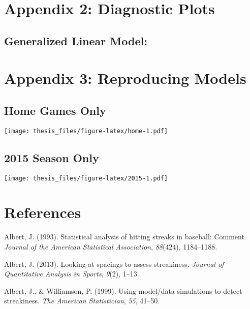 \documentclass[12pt,twoside]{dukestatscithesis}
\theoremstyle{definition}
\theoremstyle{definition}
\theoremstyle{definition}
\theoremstyle{remark}
\begin{document}
\chapter{Appendix 2: Diagnostic
Plots}\label{appendix-2-diagnostic-plots}

\section{Generalized Linear Model:}\label{generalized-linear-model-3}

\chapter{Appendix 3: Reproducing
Models}\label{appendix-3-reproducing-models}

\section{Home Games Only}\label{home-games-only}

\texttt{[image: thesis\_files/figure-latex/home-1.pdf]}

\section{2015 Season Only}\label{season-only}

\texttt{[image: thesis\_files/figure-latex/2015-1.pdf]}

\backmatter

\chapter*{References}\label{references}


\noindent

\setlength{\parindent}{-0.20in} \setlength{\leftskip}{0.20in}
\setlength{\parskip}{8pt}

\hypertarget{refs}{}
\hypertarget{ref-albert93}{}
Albert, J. (1993). Statistical analysis of hitting streaks in baseball:
Comment. \emph{Journal of the American Statistical Association},
\emph{88}(424), 1184--1188.

\hypertarget{ref-albert13}{}
Albert, J. (2013). Looking at spacings to assess streakiness.
\emph{Journal of Quantitative Analysis in Sports}, \emph{9}(2), 1--13.

\hypertarget{ref-albert99}{}
Albert, J., \& Williamson, P. (1999). Using model/data simulations to
detect streakiness. \emph{The American Statistician}, \emph{55}, 41--50.
\end{document}
